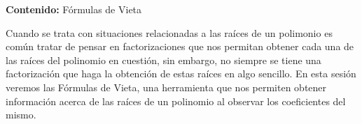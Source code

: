 {\Large
    \textbf{Contenido:} Fórmulas de Vieta
}

Cuando se trata con situaciones relacionadas a las raíces de un polimonio es común tratar de pensar en factorizaciones
que nos permitan obtener cada una de las raíces del polinomio en cuestión, sin embargo, no siempre se tiene una factorización
que haga la obtención de estas raíces en algo sencillo. En esta sesión veremos las Fórmulas de Vieta, una herramienta que nos
permiten obtener información acerca de las raíces de un polinomio al observar los coeficientes del mismo.